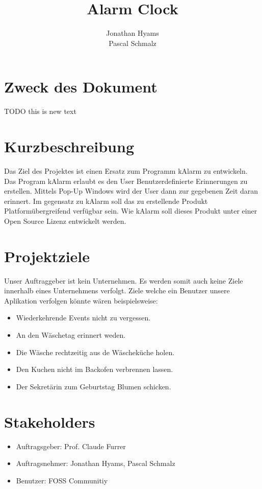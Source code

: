 \documentclass[11pt,titelpage]{scrreprt}
\title{Alarm Clock }
\author{Jonathan Hyams \\Pascal Schmalz}
\begin{document}
\thispagestyle{empty}
\maketitle
\tableofcontents

\pagestyle{fancy}


\begin{abstract}
\end{abstract}
\section{Zweck des Dokument}
TODO this is new text

\section{Kurzbeschreibung}
Das Ziel des Projektes ist einen Ersatz zum Programm kAlarm zu entwickeln.
Das Program kAlarm erlaubt es den User Benutzerdefinierte Erinnerungen zu erstellen. Mittels Pop-Up Windows wird der User dann zur gegebenen Zeit daran erinnert.
Im gegensatz zu kAlarm soll das zu erstellende Produkt Platformübergreifend verfügbar sein. Wie kAlarm soll dieses Produkt unter einer Open Source Lizenz entwickelt werden.
\section{Projektziele}
Unser Auftraggeber ist kein Unternehmen. Es werden somit auch keine Ziele innerhalb eines Unternehmens verfolgt.
Ziele welche ein Benutzer unsere Aplikation verfolgen könnte wären beispielsweise:
\begin{itemize}
 \item Wiederkehrende Events nicht zu vergessen.
 \item An den Wäschetag erinnert weden.
 \item Die Wäsche rechtzeitig aus de Wäscheküche holen.
\item Den Kuchen nicht im Backofen verbrennen lassen.
 \item Der Sekretärin zum Geburtstag Blumen schicken.

\end{itemize}

\section{Stakeholders}
\begin{itemize}
\item{Auftragsgeber: Prof. Claude Furrer}
\item{Auftragsnehmer: Jonathan Hyams, Pascal Schmalz}
\item{Benutzer: FOSS Communitiy}
\end{itemize}
\end{document}
